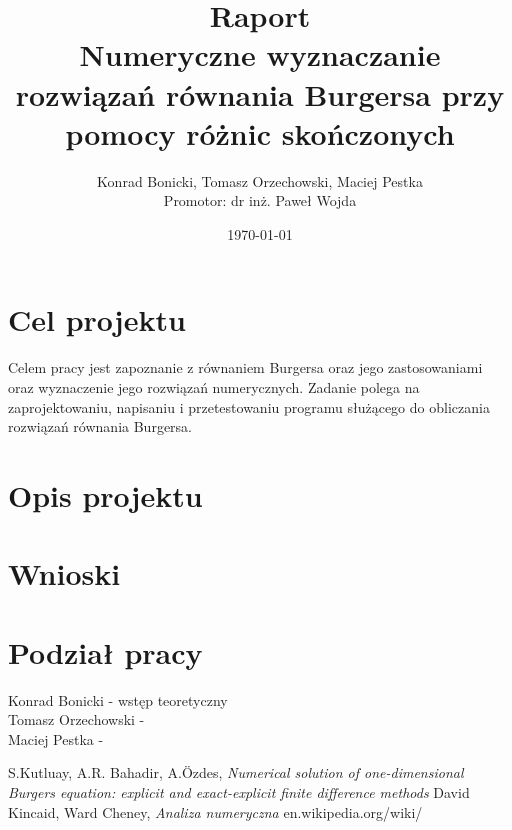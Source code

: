 \documentclass[a4paper,12pt]{article}
\title{Raport \\ Numeryczne wyznaczanie rozwiązań równania Burgersa przy pomocy różnic skończonych}
\author{Konrad Bonicki, Tomasz Orzechowski, Maciej Pestka \\ Promotor: dr inż. Paweł Wojda }
\date{\today}
\begin{document}
\maketitle

\section*{Cel projektu}
Celem pracy jest zapoznanie z równaniem Burgersa oraz jego zastosowaniami oraz wyznaczenie jego rozwiązań numerycznych. Zadanie polega na zaprojektowaniu, napisaniu i przetestowaniu programu służącego do obliczania rozwiązań równania Burgersa. 

\section*{Opis projektu}


\section*{Wnioski}


\section*{Podział pracy}
Konrad Bonicki - wstęp teoretyczny \\ 
Tomasz Orzechowski - \\
Maciej Pestka - 

\begin{thebibliography}{9}
 S.Kutluay, A.R. Bahadir, A.Özdes, \textit{Numerical solution of one-dimensional Burgers equation: explicit and exact-explicit finite difference methods}
 David Kincaid, Ward Cheney,    \textit{ Analiza numeryczna}
en.wikipedia.org/wiki/
\end{thebibliography}
\end{document}
